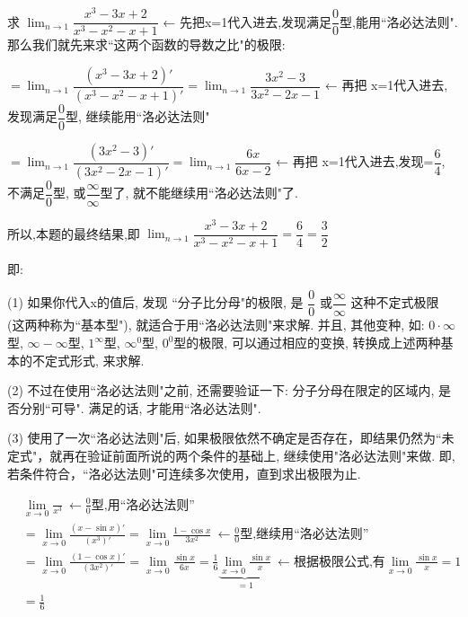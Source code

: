 \documentclass[UTF8]{ctexart}
\begin{document}
\begin{tcolorbox}[title = {例},boxrule={0.1em},colframe={black!10}, colback={black!3},colbacktitle={black!10},coltitle={black}]
	求 $\lim_{n\rightarrow 1}\dfrac{x^3-3x+2}{x^3-x^2-x+1}$  ← 先把x=1代入进去,发现满足$\dfrac{0}{0}$型,能用``洛必达法则". 那么我们就先来求``这两个函数的导数之比"的极限:
	
	$ =\lim_{n\rightarrow 1}\dfrac{\left( x^3-3x+2 \right) '}{\left( x^3-x^2-x+1 \right) '}=\lim_{n\rightarrow 1}\dfrac{3x^2-3}{3x^2-2x-1} $ ← 再把 x=1代入进去,发现满足$\dfrac{0}{0}$型, 继续能用``洛必达法则"
	
	$=\lim_{n\rightarrow 1}\dfrac{\left( 3x^2-3 \right) '}{\left( 3x^2-2x-1 \right) '}=\lim_{n\rightarrow 1}\dfrac{6x}{6x-2} $ ← 再把 x=1代入进去,发现=$\dfrac{6}{4}$, 不满足$\dfrac{0}{0}$型, 或$\dfrac{\infty}{\infty}$型了, 就不能继续用``洛必达法则"了.
	
	所以,本题的最终结果,即 $\lim_{n\rightarrow 1}\dfrac{x^3-3x+2}{x^3-x^2-x+1}=\dfrac{6}{4}=\dfrac{3}{2}$
\end{tcolorbox}  



即: 

(1) 如果你代入x的值后, 发现 ``分子比分母"的极限, 是 $ \dfrac{0} {0}$ 或$ \dfrac{\infty} {\infty}$ 这种不定式极限 (这两种称为``基本型"), 就适合于用``洛必达法则"来求解. 并且, 其他变种, 如: $ 0 \cdot \infty$型, $\infty-\infty$型, $1^{\infty}$型, $\infty^0$型, $0^0$型的极限,  可以通过相应的变换, 转换成上述两种基本的不定式形式, 来求解.

(2) 不过在使用``洛必达法则"之前, 还需要验证一下: 分子分母在限定的区域内, 是否分别``可导". 满足的话, 才能用``洛必达法则".

(3) 使用了一次``洛必达法则"后, 如果极限依然不确定是否存在，即结果仍然为``未定式"，就再在验证前面所说的两个条件的基础上, 继续使用"洛必达法则"来做.  即, 若条件符合，``洛必达法则"可连续多次使用，直到求出极限为止.


\begin{tcolorbox}[title = {例},boxrule={0.1em},colframe={black!10}, colback={black!3},colbacktitle={black!10},coltitle={black}]
	\begin{align*}  %
		&\lim_{x\rightarrow 0}\frac{}{x^3}\ \gets \frac{0}{0}\text{型,用}\text{洛必达法则}\\
		&=\lim_{x\rightarrow 0}\frac{\left( x-\sin x \right) '}{\left( x^3 \right) '}=\lim_{x\rightarrow 0}\frac{1-\cos x}{3x^2}\ \gets \frac{0}{0}\text{型,继续用}\text{洛必达法则}\\
		&=\lim_{x\rightarrow 0}\frac{\left( 1-\cos x \right) '}{\left( 3x^2 \right) '}=\lim_{x\rightarrow 0}\frac{\sin x}{6x}=\frac{1}{6}\underset{=1}{\underbrace{\lim_{x\rightarrow 0}\frac{\sin x}{x}}}\ \gets \text{根据极限公式,有}\lim_{x\rightarrow 0}\frac{\sin x}{x}=1\\
		&=\frac{1}{6}
	\end{align*}
\end{tcolorbox}
\end{document}
